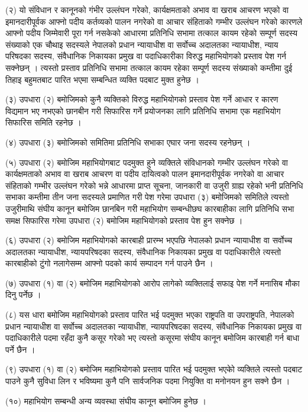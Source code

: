 (२) यो संविधान र कानूनको गंभीर उल्लंघन गरेको, कार्यक्षमताको अभाव वा खराब आचरण भएको वा इमानदारीपूर्वक आफ्नो पदीय कर्तव्यको पालन नगरेको वा आचार संहिताको गम्भीर उल्लंघन गरेको कारणले आफ्नो पदीय जिम्मेवारी पूरा गर्न नसकेको आधारमा प्रतिनिधि सभामा तत्काल कायम रहेको सम्पूर्ण सदस्य संख्याको एक चौथाइ सदस्यले नेपालको प्रधान न्यायाधीश वा सर्वोच्च अदालतका न्यायाधीश, न्याय परिषदका सदस्य, संवैधानिक निकायका प्रमुख वा पदाधिकारीका विरुद्ध महाभियोगको प्रस्ताव पेश गर्न सक्नेछन् । त्यस्तो प्रस्ताव प्रतिनिधि सभामा तत्काल कायम रहेका सम्पूर्ण सदस्य संख्याको कम्तीमा दुई तिहाइ बहुमतबाट पारित भएमा सम्बन्धित व्यक्ति पदबाट मुक्त हुनेछ ।

(३) उपधारा (२) बमोजिमको कुनै व्यक्तिको विरुद्ध महाभियोगको प्रस्ताव पेश गर्ने आधार र कारण विद्यमान भए नभएको छानबीन गरी सिफारिस गर्ने प्रयोजनका लागि प्रतिनिधि सभामा एक महाभियोग सिफारिस समिति रहनेछ ।

(४) उपधारा (३) बमोजिमको समितिमा प्रतिनिधि सभाका एघार जना सदस्य रहनेछन् ।

(५) उपधारा (२) बमोजिम महाभियोगबाट पदमुक्त हुने व्यक्तिले संविधानको गम्भीर उल्लंघन गरेको वा कार्यक्षमताको अभाव वा खराब आचरण वा पदीय दायित्वको पालन इमानदारीपूर्वक नगरेको वा आचार संहिताको गम्भीर उल्लंघन गरेको भन्ने आधारमा प्राप्त सूचना, जानकारी वा उजुरी ग्राह्य रहेको भनी प्रतिनिधि सभाका कम्तीमा तीन जना सदस्यले प्रमाणित गरी पेश गरेमा उपधारा (३) बमोजिमको समितिले त्यस्तो उजुरीमाथि संघीय कानून बमोजिम छानबिन गरी महाभियोग सम्बन्धीछघ कारबाहीका लागि प्रतिनिधि सभा समक्ष सिफारिस गरेमा उपधारा (२) बमोजिम महाभियोगको प्रस्ताव पेश हुन सक्नेछ ।

(६) उपधारा (२) बमोजिम महाभियोगको कारबाही प्रारम्भ भएपछि नेपालको प्रधान न्यायाधीश वा सर्वोच्च अदालतका न्यायाधीश, न्यायपरिषदका सदस्य, संवैधानिक निकायका प्रमुख वा पदाधिकारीले त्यस्तो कारबाहीको टुंगो नलागेसम्म आफ्नो पदको कार्य सम्पादन गर्न पाउने छैन ।

(७) उपधारा (१) वा (२) बमोजिम महाभियोगको आरोप लागेको व्यक्तिलाई सफाइ पेश गर्ने मनासिब मौका दिनु पर्नेछ ।

(८) यस धारा बमोजिम महाभियोगको प्रस्ताव पारित भई पदमुक्त भएका राष्ट्रपति वा उपराष्ट्रपति, नेपालको प्रधान न्यायाधीश वा सर्वोच्च अदालतका न्यायाधीश, न्यायपरिषदका सदस्य, संवैधानिक निकायका प्रमुख वा पदाधिकारीले पदमा रहँदा कुनै कसूर गरेको भए त्यस्तो कसूरमा संघीय कानून बमोजिम कारबाही गर्न बाधा पर्ने छैन ।

(९) उपधारा (१) वा (२) बमोजिम महाभियोगको प्रस्ताव पारित भई पदमुक्त भएकोे व्यक्तिले त्यस्तो पदबाट पाउने कुनै सुविधा लिन र भविष्यमा कुनै पनि सार्वजनिक पदमा नियुक्ति वा मनोनयन हुन सक्ने छैन ।

(१०) महाभियोग सम्बन्धी अन्य व्यवस्था संघीय कानून बमोजिम हुनेछ ।

